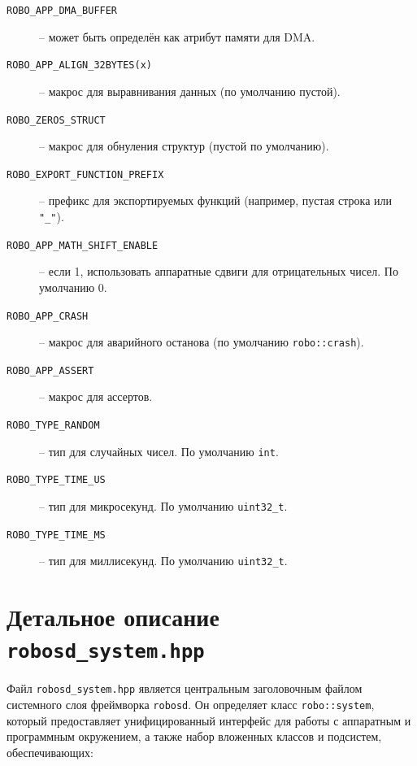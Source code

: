 \documentclass[a4paper,12pt]{article}
\begin{document}
\begin{description}
    \item[\texttt{ROBO\_APP\_DMA\_BUFFER}] -- может быть определён как атрибут памяти для DMA.
    \item[\texttt{ROBO\_APP\_ALIGN\_32BYTES(x)}] -- макрос для выравнивания данных (по умолчанию пустой).
    \item[\texttt{ROBO\_ZEROS\_STRUCT}] -- макрос для обнуления структур (пустой по умолчанию).
    \item[\texttt{ROBO\_EXPORT\_FUNCTION\_PREFIX}] -- префикс для экспортируемых функций (например, пустая строка или \texttt{"\_"}).
    \item[\texttt{ROBO\_APP\_MATH\_SHIFT\_ENABLE}] -- если 1, использовать аппаратные сдвиги для отрицательных чисел. По умолчанию 0.
    \item[\texttt{ROBO\_APP\_CRASH}] -- макрос для аварийного останова (по умолчанию \texttt{robo::crash}).
    \item[\texttt{ROBO\_APP\_ASSERT}] -- макрос для ассертов.
    \item[\texttt{ROBO\_TYPE\_RANDOM}] -- тип для случайных чисел. По умолчанию \texttt{int}.
    \item[\texttt{ROBO\_TYPE\_TIME\_US}] -- тип для микросекунд. По умолчанию \texttt{uint32\_t}.
    \item[\texttt{ROBO\_TYPE\_TIME\_MS}] -- тип для миллисекунд. По умолчанию \texttt{uint32\_t}.
\end{description}

\section{Детальное описание \texttt{robosd\_system.hpp}}

Файл \texttt{robosd\_system.hpp} является центральным заголовочным файлом системного слоя фреймворка \texttt{robosd}. Он определяет класс \texttt{robo::system}, который предоставляет унифицированный интерфейс для работы с аппаратным и программным окружением, а также набор вложенных классов и подсистем, обеспечивающих:
\end{document}
